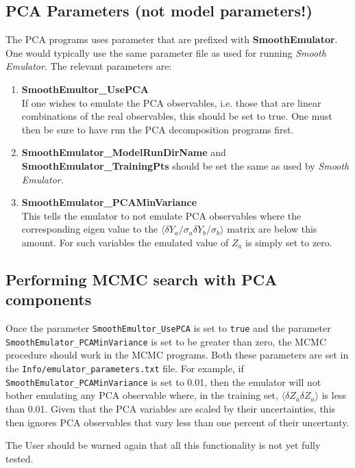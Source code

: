 \documentclass[UserManual.tex]{subfiles}
\begin{document}
\subsection{PCA Parameters (not model parameters!)}
The PCA programs uses parameter that are prefixed with {\bf SmoothEmulator}. One would typically use the same parameter file as used for running {\it Smooth Emulator}. The relevant parameters are:
\begin{enumerate}\itemsep=0pt
\item {\bf SmoothEmultor\_UsePCA}\\
If one wishes to emulate the PCA observables, i.e. those that are linear combinations of the real observables, this should be set to true. One must then be sure to have run the PCA decomposition programs first. 
\item {\bf SmoothEmulator\_ModelRunDirName} and {\bf SmoothEmulator\_TrainingPts} should be set the same as used by {\it Smooth Emulator}.
\item {\bf SmoothEmulator\_PCAMinVariance}\\
This tells the emulator to not emulate PCA observables where the corresponding eigen value to the $\langle \delta Y_a/\sigma_a\delta Y_b/\sigma_b\rangle$ matrix are below this amount. For such variables the emulated value of $Z_a$ is simply set to zero.
\end{enumerate}

\subsection{Performing MCMC search with PCA components}
Once the parameter {\tt SmoothEmultor\_UsePCA} is set to {\tt true} and the parameter\\{\tt SmoothEmulator\_PCAMinVariance} is set to be greater than zero, the MCMC procedure should work in the MCMC programs. Both these parameters are set in the {\tt Info/emulator\_parameters.txt} file. For example, if {\tt SmoothEmulator\_PCAMinVariance} is set to 0.01, then the emulator will not bother emulating any PCA observable where, in the training set, $\langle\delta Z_a\delta Z_a\rangle$ is less than 0.01. Given that the PCA variables are scaled by their uncertainties, this then ignores PCA observables that vary less than one percent of their uncertanty.

The User should be warned again that all this functionality is not yet fully tested.
\end{document}
